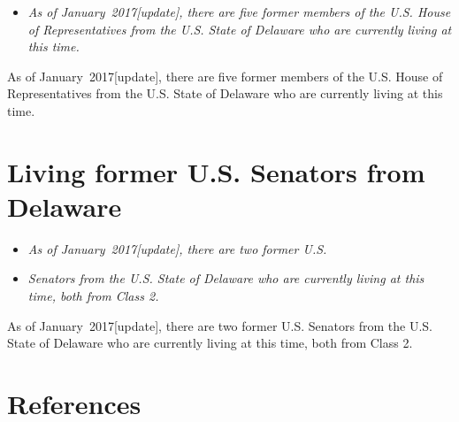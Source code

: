 \begin{itemize}
\item
  \emph{As of January~2017{[}update{]}, there are five former members of
  the U.S. House of Representatives from the U.S. State of Delaware who
  are currently living at this time.}
\end{itemize}

As of January~2017{[}update{]}, there are five former members of the
U.S. House of Representatives from the U.S. State of Delaware who are
currently living at this time.

\section{Living former U.S. Senators from
Delaware}\label{living-former-u.s.-senators-from-delaware}

\begin{itemize}
\item
  \emph{As of January~2017{[}update{]}, there are two former U.S.}
\item
  \emph{Senators from the U.S. State of Delaware who are currently
  living at this time, both from Class 2.}
\end{itemize}

As of January~2017{[}update{]}, there are two former U.S. Senators from
the U.S. State of Delaware who are currently living at this time, both
from Class 2.

\section{References}\label{references}


